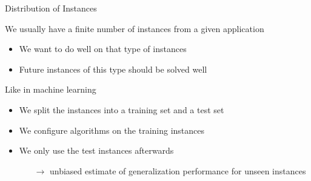 \begin{frame}[c]{Distribution of Instances}

We usually have a finite number of instances from a given application
\begin{itemize}
  \item We want to do well on that type of instances
  \item Future instances of this type should be solved well 
\end{itemize}

\pause
\bigskip

Like in machine learning
\begin{itemize}
  \item We split the instances into a \alert{training set} and a \alert{test set}
  \item We configure algorithms on the training instances
  \item We only use the test instances afterwards
  \begin{itemize}
    \item[$\to$] unbiased estimate of generalization performance for unseen instances
  \end{itemize}  
\end{itemize}


\end{frame}
